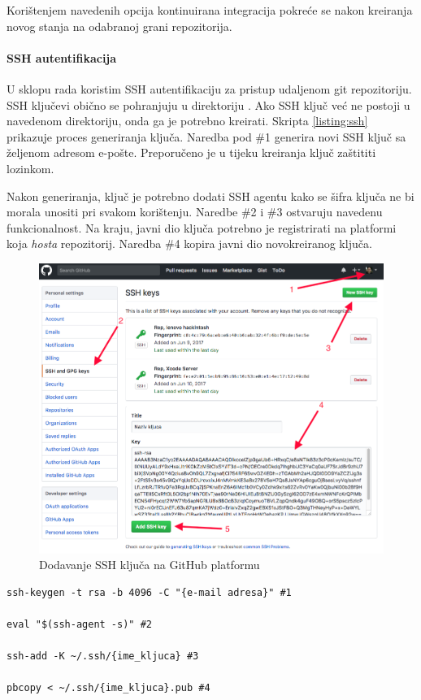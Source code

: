 \documentclass[times, utf8, diplomski, numeric]{fer}
\begin{document}
Korištenjem navedenih opcija kontinuirana integracija pokreće se nakon kreiranja novog stanja na odabranoj grani repozitorija.

\paragraph{SSH autentifikacija}

U sklopu rada koristim SSH autentifikaciju za pristup udaljenom git repozitoriju. SSH ključevi obično se pohranjuju u direktoriju . Ako SSH ključ već ne postoji u navedenom direktoriju, onda ga je potrebno kreirati. Skripta \ref{listing:ssh} prikazuje proces generiranja ključa. Naredba pod \#1 generira novi SSH ključ sa željenom adresom e-pošte. Preporučeno je u tijeku kreiranja ključ zaštititi lozinkom.

Nakon generiranja, ključ je potrebno dodati SSH agentu kako se šifra ključa ne bi morala unositi pri svakom korištenju. Naredbe \#2 i \#3 ostvaruju navedenu funkcionalnost. Na kraju, javni dio ključa potrebno je registrirati na platformi koja \textit{hosta} repozitorij. Naredba \#4 kopira javni dio novokreiranog ključa.

\begin{figure}[b!]
\centering
\includegraphics[scale=0.3]{GitHubSSH}
\caption{Dodavanje SSH ključa na GitHub platformu}
\label{fig:GitHubSSH}
\end{figure}

\begin{lstlisting}[caption=Postavljanje SSH autentifikacije, label=listing:ssh]
ssh-keygen -t rsa -b 4096 -C "{e-mail adresa}" #1

eval "$(ssh-agent -s)" #2

ssh-add -K ~/.ssh/{ime_kljuca} #3

pbcopy < ~/.ssh/{ime_kljuca}.pub #4
\end{lstlisting}
\end{document}
